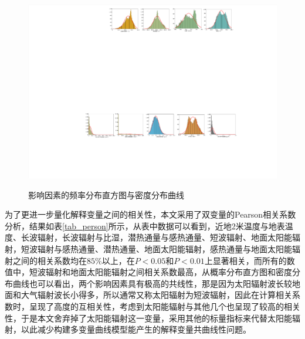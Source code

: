 \documentclass[a4paper,10pt]{my_paper}
\numberwithin{equation}{section}
\begin{document}
\begin{figure}[!htbp]
{    \includegraphics[width=.9\textwidth]{Sig_Histogram_5.pdf}
    }
    \caption{影响因素的频率分布直方图与密度分布曲线}\label{fig_Histogram}
\end{figure}

为了更进一步量化解释变量之间的相关性，本文采用了双变量的Pearson相关系数分析，结果如表\ref{tab_person}所示，从表中数据可以看到，近地2米温度与地表温度、长波辐射，长波辐射与比湿，潜热通量与感热通量、短波辐射、地面太阳能辐射，短波辐射与感热通量、潜热通量、地面太阳能辐射，感热通量与地面太阳能辐射之间的相关系数均在${85\%}$以上，在${P<0.05}$和${P<0.01}$上显著相关，而所有的数值中，短波辐射和地面太阳能辐射之间相关系数最高，从概率分布直方图和密度分布曲线也可以看出，两个影响因素具有极高的共线性，那是因为太阳辐射波长较地面和大气辐射波长小得多，所以通常又称太阳辐射为短波辐射，因此在计算相关系数时，呈现了高度的互相关性，考虑到太阳能辐射与其他几个也呈现了较高的相关性，于是本文舍弃掉了太阳能辐射这一变量，采用其他的标量指标来代替太阳能辐射，以此减少构建多变量曲线模型能产生的解释变量共曲线性问题。
\end{document}
